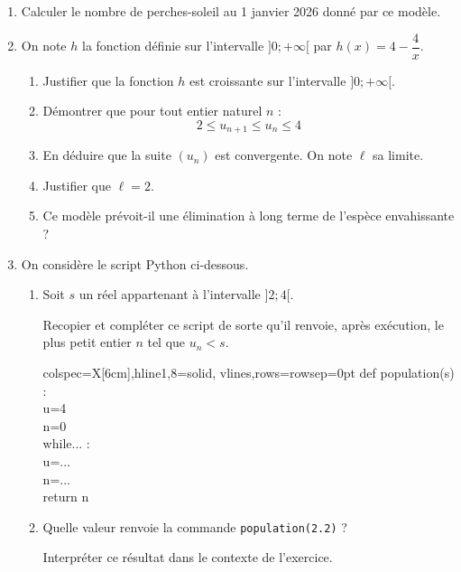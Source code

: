 \begin{enumerate}
\item Calculer le nombre de perches-soleil au 1 janvier 2026 donné par ce modèle.
\item On note $h$ la fonction définie sur l'intervalle $] 0;+\infty[$ par  \quad $h(x)=4-\dfrac{4}{x}$.
	\begin{enumerate}
		\item Justifier que la fonction $h$ est croissante sur l'intervalle $] 0;+\infty[$.
		\item Démontrer que pour tout entier naturel $n$ :
\[ 2 \leqslant u_{n+1} \leqslant u_{n} \leqslant 4 \]

		\item En déduire que la suite $\left(u_{n}\right)$ est convergente. On note $\ell$ sa limite.
		\item Justifier que $\ell = 2$.
		\item Ce modèle prévoit-il une élimination à long terme de l'espèce envahissante ?
	\end{enumerate}

\item On considère le script Python ci-dessous.
	\begin{enumerate}
		\item Soit $s$ un réel appartenant à l'intervalle $] 2; 4[$.
		
Recopier et compléter ce script de sorte qu'il renvoie, après exécution, le plus petit entier $n$ tel que $u_{n}<s$.

\begin{center}
\begin{ttfamily}
\begin{tblr}{colspec={X[6cm]},hline{1,8}={solid},
	vlines,rows={rowsep=0pt}}
	def population(s) :\\
	\quad u=4\\
	\quad n=0\\
	\quad while... :\\
	\quad \quad u=...\\
	\quad \quad n=...\\
	\quad return n
	\end{tblr}
	\end{ttfamily}
\end{center}
		\item Quelle valeur renvoie la commande \texttt{population(2.2)} ?

		Interpréter ce résultat dans le contexte de l'exercice.
	\end{enumerate}
\end{enumerate}


